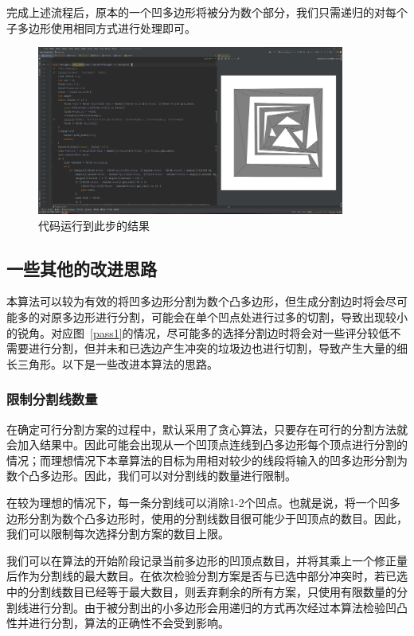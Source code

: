 完成上述流程后，原本的一个凹多边形将被分为数个部分，我们只需递归的对每个子多边形使用相同方式进行处理即可。

\begin{figure}[htp]
    \centering
    \includegraphics[width=0.9\textwidth]
    {figures/output.png}
    \caption{代码运行到此步的结果}
  \end{figure}

\subsection{一些其他的改进思路}
本算法可以较为有效的将凹多边形分割为数个凸多边形，但生成分割边时将会尽可能多的对原多边形进行分割，可能会在单个凹点处进行过多的切割，导致出现较小的锐角。对应图~\ref*{pass1}的情况，尽可能多的选择分割边时将会对一些评分较低不需要进行分割，但并未和已选边产生冲突的垃圾边也进行切割，导致产生大量的细长三角形。以下是一些改进本算法的思路。

\subsubsection{限制分割线数量}
在确定可行分割方案的过程中，默认采用了贪心算法，只要存在可行的分割方法就会加入结果中。因此可能会出现从一个凹顶点连线到凸多边形每个顶点进行分割的情况；而理想情况下本章算法的目标为用相对较少的线段将输入的凹多边形分割为数个凸多边形。因此，我们可以对分割线的数量进行限制。

在较为理想的情况下，每一条分割线可以消除1-2个凹点。也就是说，将一个凹多边形分割为数个凸多边形时，使用的分割线数目很可能少于凹顶点的数目。因此，我们可以限制每次选择分割方案的数目上限。

我们可以在算法的开始阶段记录当前多边形的凹顶点数目，并将其乘上一个修正量后作为分割线的最大数目。在依次检验分割方案是否与已选中部分冲突时，若已选中的分割线数目已经等于最大数目，则丢弃剩余的所有方案，只使用有限数量的分割线进行分割。由于被分割出的小多边形会用递归的方式再次经过本算法检验凹凸性并进行分割，算法的正确性不会受到影响。

